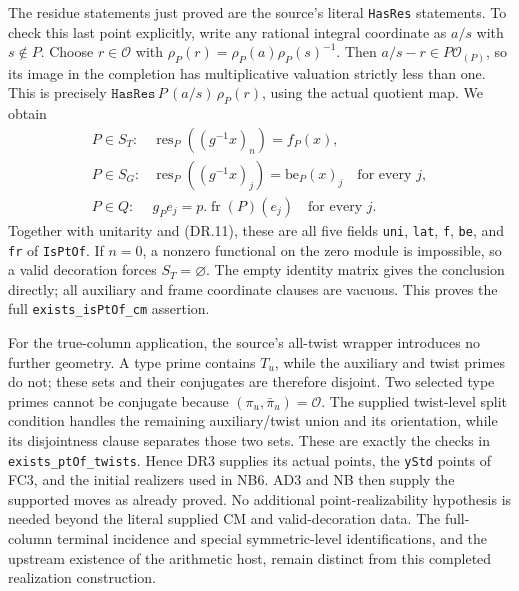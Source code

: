 The residue statements just proved are the source's literal
\texttt{HasRes} statements. To check this last point explicitly,
write any rational integral coordinate as $a/s$ with $s\notin P$.
Choose $r\in\mathcal O$ with
$\rho_P(r)=\rho_P(a)\rho_P(s)^{-1}$.
Then $a/s-r\in P\mathcal O_{(P)}$, so its image in the completion
has multiplicative valuation strictly less than one. This is precisely
$\texttt{HasRes}\,P\,(a/s)\,\rho_P(r)$, using the actual quotient
map. We obtain
\[
\begin{array}{ll}
 P\in S_T:&\operatorname{res}_P((g^{-1}x)_n)=f_P(x),\\
 P\in S_G:&\operatorname{res}_P((g^{-1}x)_j)
                                      =\mathrm{be}_P(x)_j
                                      \quad\text{for every }j,\\
 P\in Q:&g_Pe_j=p.\operatorname{fr}(P)(e_j)
                                      \quad\text{for every }j.
\end{array}                                                     \tag{DR.14}
\]
Together with unitarity and (DR.11), these are all five fields
\texttt{uni}, \texttt{lat}, \texttt{f}, \texttt{be}, and \texttt{fr}
of \texttt{IsPtOf}. If $n=0$, a nonzero functional on the zero
module is impossible, so a valid decoration forces $S_T=\varnothing$.
The empty identity matrix gives the conclusion directly; all auxiliary
and frame coordinate clauses are vacuous.
This proves the full \texttt{exists\_isPtOf\_cm} assertion.

For the true-column application, the source's all-twist wrapper
introduces no further geometry. A type prime contains $T_u$, while
the auxiliary and twist primes do not; these sets and their conjugates
are therefore disjoint. Two selected type primes cannot be conjugate
because $(\pi_u,\bar\pi_u)=\mathcal O$. The supplied twist-level
split condition handles the remaining auxiliary/twist union and its
orientation, while its disjointness clause separates those two sets.
These are exactly the checks in \texttt{exists\_ptOf\_twists}.
Hence DR3 supplies its actual points, the \texttt{yStd} points of FC3,
and the initial realizers used in NB6. AD3 and NB then supply the
supported moves as already proved. No additional point-realizability
hypothesis is needed beyond the literal supplied CM and valid-decoration
data. The full-column terminal incidence and special symmetric-level
identifications, and the upstream existence of the arithmetic host,
remain distinct from this completed realization construction.
